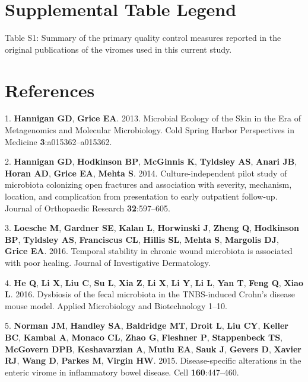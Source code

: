 \documentclass[12pt,]{article}
\begin{document}
\newpage

\section{Supplemental Table Legend}\label{supplemental-table-legend}

Table S1: Summary of the primary quality control measures reported in
the original publications of the viromes used in this current study.

\newpage

\section*{References}\label{references}

\hypertarget{refs}{}
\hypertarget{ref-Hannigan:2013im}{}
1. \textbf{Hannigan GD}, \textbf{Grice EA}. 2013. Microbial Ecology of
the Skin in the Era of Metagenomics and Molecular Microbiology. Cold
Spring Harbor Perspectives in Medicine \textbf{3}:a015362--a015362.

\hypertarget{ref-Hannigan:2014be}{}
2. \textbf{Hannigan GD}, \textbf{Hodkinson BP}, \textbf{McGinnis K},
\textbf{Tyldsley AS}, \textbf{Anari JB}, \textbf{Horan AD},
\textbf{Grice EA}, \textbf{Mehta S}. 2014. Culture-independent pilot
study of microbiota colonizing open fractures and association with
severity, mechanism, location, and complication from presentation to
early outpatient follow-up. Journal of Orthopaedic Research
\textbf{32}:597--605.

\hypertarget{ref-Loesche:2016ev}{}
3. \textbf{Loesche M}, \textbf{Gardner SE}, \textbf{Kalan L},
\textbf{Horwinski J}, \textbf{Zheng Q}, \textbf{Hodkinson BP},
\textbf{Tyldsley AS}, \textbf{Franciscus CL}, \textbf{Hillis SL},
\textbf{Mehta S}, \textbf{Margolis DJ}, \textbf{Grice EA}. 2016.
Temporal stability in chronic wound microbiota is associated with poor
healing. Journal of Investigative Dermatology.

\hypertarget{ref-He:2016ch}{}
4. \textbf{He Q}, \textbf{Li X}, \textbf{Liu C}, \textbf{Su L},
\textbf{Xia Z}, \textbf{Li X}, \textbf{Li Y}, \textbf{Li L}, \textbf{Yan
T}, \textbf{Feng Q}, \textbf{Xiao L}. 2016. Dysbiosis of the fecal
microbiota in the TNBS-induced Crohn's disease mouse model. Applied
Microbiology and Biotechnology 1--10.

\hypertarget{ref-Norman:2015kb}{}
5. \textbf{Norman JM}, \textbf{Handley SA}, \textbf{Baldridge MT},
\textbf{Droit L}, \textbf{Liu CY}, \textbf{Keller BC}, \textbf{Kambal
A}, \textbf{Monaco CL}, \textbf{Zhao G}, \textbf{Fleshner P},
\textbf{Stappenbeck TS}, \textbf{McGovern DPB}, \textbf{Keshavarzian A},
\textbf{Mutlu EA}, \textbf{Sauk J}, \textbf{Gevers D}, \textbf{Xavier
RJ}, \textbf{Wang D}, \textbf{Parkes M}, \textbf{Virgin HW}. 2015.
Disease-specific alterations in the enteric virome in inflammatory bowel
disease. Cell \textbf{160}:447--460.
\end{document}
